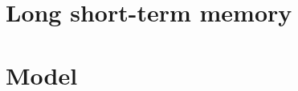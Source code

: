 \documentclass[12pt,letterpaper]{article}
\theoremstyle{remark}
\theoremstyle{plain}
\begin{document}








\section{Long short-term memory}









\section{Model}

\end{document}
